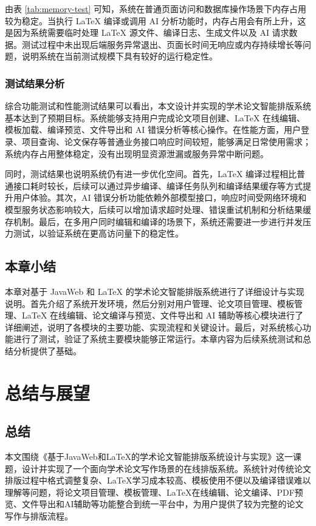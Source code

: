 \documentclass{xduugthesis}
\begin{document}
由表 \ref{tab:memory-test} 可知，系统在普通页面访问和数据库操作场景下内存占用较为稳定。当执行 LaTeX 编译或调用 AI 分析功能时，内存占用会有所上升，这是因为系统需要临时处理 LaTeX 源文件、编译日志、生成文件以及 AI 请求数据。测试过程中未出现后端服务异常退出、页面长时间无响应或内存持续增长等问题，说明系统在当前测试规模下具有较好的运行稳定性。

\subsection{测试结果分析}

综合功能测试和性能测试结果可以看出，本文设计并实现的学术论文智能排版系统基本达到了预期目标。系统能够支持用户完成论文项目创建、LaTeX 在线编辑、模板加载、编译预览、文件导出和 AI 错误分析等核心操作。在性能方面，用户登录、项目查询、论文保存等普通业务接口响应时间较短，能够满足日常使用需求；系统内存占用整体稳定，没有出现明显资源泄漏或服务异常中断问题。

同时，测试结果也说明系统仍有进一步优化空间。首先，LaTeX 编译过程相比普通接口耗时较长，后续可以通过异步编译、编译任务队列和编译结果缓存等方式提升用户体验。其次，AI 错误分析功能依赖外部模型接口，响应时间受网络环境和模型服务状态影响较大，后续可以增加请求超时处理、错误重试机制和分析结果缓存机制。最后，在多用户同时编辑和编译的场景下，系统还需要进一步进行并发压力测试，以验证系统在更高访问量下的稳定性。

\section{本章小结}
本章对基于 JavaWeb 和 LaTeX 的学术论文智能排版系统进行了详细设计与实现说明。首先介绍了系统开发环境，然后分别对用户管理、论文项目管理、模板管理、LaTeX 在线编辑、论文编译与预览、文件导出和 AI 辅助等核心模块进行了详细阐述，说明了各模块的主要功能、实现流程和关键设计。最后，对系统核心功能进行了测试，验证了系统主要模块能够正常运行。本章内容为后续系统测试和总结分析提供了基础。

\chapter{总结与展望}

\section{总结}
本文围绕《基于JavaWeb和LaTeX的学术论文智能排版系统设计与实现》这一课题，设计并实现了一个面向学术论文写作场景的在线排版系统。系统针对传统论文排版过程中格式调整复杂、LaTeX学习成本较高、模板使用不便以及编译错误难以理解等问题，将论文项目管理、模板管理、LaTeX在线编辑、论文编译、PDF预览、文件导出和AI辅助等功能整合到统一平台中，为用户提供了较为完整的论文写作与排版流程。
\end{document}
